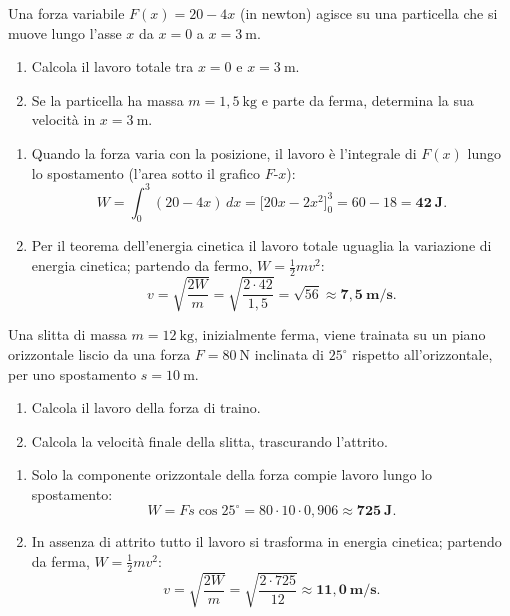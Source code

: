 
\begin{question}[ID=1.3, subtitle={Lavoro di una forza variabile F(x) = 20 - 4x}, tags={lavoro, energia, integrale}, difficulty=media]
Una forza variabile $F(x) = 20 - 4x$ (in newton) agisce su una particella che si muove lungo l'asse $x$ da $x = 0$ a $x = 3\ \text{m}$.
\begin{enumerate}
    \item Calcola il lavoro totale tra $x = 0$ e $x = 3\ \text{m}$.
    \item Se la particella ha massa $m = 1{,}5\ \text{kg}$ e parte da ferma, determina la sua velocità in $x = 3\ \text{m}$.
\end{enumerate}
\begin{solution}
\begin{enumerate}
    \item Quando la forza varia con la posizione, il lavoro è l'integrale di $F(x)$ lungo lo spostamento (l'area sotto il grafico $F$-$x$):
    \[
    W = \int_0^3 (20 - 4x)\,dx = \bigl[20x - 2x^2\bigr]_0^3 = 60 - 18 = \mathbf{42\ \text{J}}.
    \]
    \item Per il teorema dell'energia cinetica il lavoro totale uguaglia la variazione di energia cinetica; partendo da fermo, $W = \tfrac{1}{2}mv^2$:
    \[
    v = \sqrt{\frac{2W}{m}} = \sqrt{\frac{2\cdot 42}{1{,}5}} = \sqrt{56} \approx \mathbf{7{,}5\ \text{m/s}}.
    \]
\end{enumerate}
\end{solution}
\end{question}


\begin{question}[ID=1.4, subtitle={Slitta trainata con forza a 25° su piano orizzontale}, tags={lavoro, energia}, difficulty=media]
Una slitta di massa $m = 12\ \text{kg}$, inizialmente ferma, viene trainata su un piano orizzontale liscio da una forza $F = 80\ \text{N}$ inclinata di $25^\circ$ rispetto all'orizzontale, per uno spostamento $s = 10\ \text{m}$.
\begin{enumerate}
    \item Calcola il lavoro della forza di traino.
    \item Calcola la velocità finale della slitta, trascurando l'attrito.
\end{enumerate}
\begin{solution}
\begin{enumerate}
    \item Solo la componente orizzontale della forza compie lavoro lungo lo spostamento:
    \[
    W = Fs\cos 25^\circ = 80\cdot 10\cdot 0{,}906 \approx \mathbf{725\ \text{J}}.
    \]
    \item In assenza di attrito tutto il lavoro si trasforma in energia cinetica; partendo da ferma, $W = \tfrac{1}{2}mv^2$:
    \[
    v = \sqrt{\frac{2W}{m}} = \sqrt{\frac{2\cdot 725}{12}} \approx \mathbf{11{,}0\ \text{m/s}}.
    \]
\end{enumerate}
\end{solution}
\end{question}

